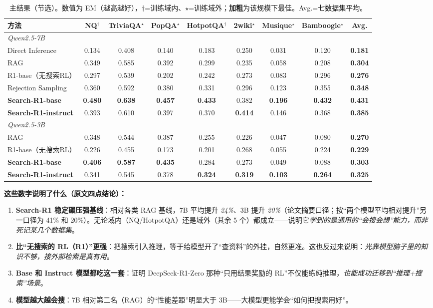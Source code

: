 \documentclass[11pt,UTF8,fontset=fandol]{ctexart}
\begin{document}
\begin{table}[H]\centering
\caption{主结果（节选）。数值为 EM（越高越好），$\dagger$=训练域内、$\star$=训练域外；\textbf{加粗}为该规模下最佳。Avg.=七数据集平均。}
\label{tab:main}
\small
\begin{tabular}{lccccccc>{\bfseries}c}
\toprule
方法 & NQ$^\dagger$ & TriviaQA$^\star$ & PopQA$^\star$ & HotpotQA$^\dagger$ & 2wiki$^\star$ & Musique$^\star$ & Bamboogle$^\star$ & Avg. \\
\midrule
\multicolumn{9}{l}{\emph{Qwen2.5-7B}}\\
Direct Inference   & 0.134 & 0.408 & 0.140 & 0.183 & 0.250 & 0.031 & 0.120 & 0.181 \\
RAG                & 0.349 & 0.585 & 0.392 & 0.299 & 0.235 & 0.058 & 0.208 & 0.304 \\
R1-base（无搜索RL）  & 0.297 & 0.539 & 0.202 & 0.242 & 0.273 & 0.083 & 0.296 & 0.276 \\
Rejection Sampling & 0.360 & 0.592 & 0.380 & 0.331 & 0.296 & 0.123 & 0.355 & 0.348 \\
\textbf{Search-R1-base}     & \textbf{0.480} & \textbf{0.638} & \textbf{0.457} & \textbf{0.433} & 0.382 & \textbf{0.196} & \textbf{0.432} & \textbf{0.431} \\
\textbf{Search-R1-instruct} & 0.393 & 0.610 & 0.397 & 0.370 & \textbf{0.414} & 0.146 & 0.368 & 0.385 \\
\midrule
\multicolumn{9}{l}{\emph{Qwen2.5-3B}}\\
RAG                & 0.348 & 0.544 & 0.387 & 0.255 & 0.226 & 0.047 & 0.080 & 0.270 \\
R1-base（无搜索RL）  & 0.226 & 0.455 & 0.173 & 0.201 & 0.268 & 0.055 & 0.224 & 0.229 \\
\textbf{Search-R1-base}     & \textbf{0.406} & \textbf{0.587} & \textbf{0.435} & 0.284 & 0.273 & 0.049 & 0.088 & 0.303 \\
\textbf{Search-R1-instruct} & 0.341 & 0.545 & 0.378 & \textbf{0.324} & \textbf{0.319} & \textbf{0.103} & \textbf{0.264} & \textbf{0.325} \\
\bottomrule
\end{tabular}
\end{table}

\textbf{这些数字说明了什么（原文四点结论）：}
\begin{enumerate}[leftmargin=1.6em]
\item \textbf{Search-R1 稳定碾压强基线}：相对各类 RAG 基线，7B 平均提升 \emph{24\%}、3B 提升 \emph{20\%}（论文摘要口径；按“两个模型平均相对提升”另一口径为 41\% 和 20\%）。无论域内（NQ/HotpotQA）还是域外（其余 5 个）都成立——说明它\emph{学到的是通用的“会搜会想”能力，而非死记某几个数据集}。
\item \textbf{比“无搜索的 RL（R1）”更强}：把搜索引入推理，等于给模型开了“查资料”的外挂，自然更准。这也反过来说明：\emph{光靠模型脑子里的知识不够，接外部检索是真有用}。
\item \textbf{Base 和 Instruct 模型都吃这一套}：证明 DeepSeek-R1-Zero 那种“只用结果奖励的 RL”不仅能练纯推理，\emph{也能成功迁移到“推理+搜索”场景}。
\item \textbf{模型越大越会搜}：7B 相对第二名（RAG）的“性能差距”明显大于 3B——大模型更能学会“如何把搜索用好”。
\end{enumerate}
\end{document}
